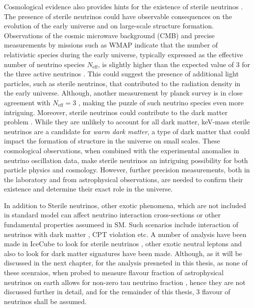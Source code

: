 Cosmological evidence also provides hints for the existence of sterile neutrinos . The presence of sterile neutrinos could have observable consequences on the evolution of the early universe and on large-scale structure formation. Observations of the cosmic microwave background (CMB) and precise measurements by missions such as WMAP indicate that the number of relativistic species during the early universe, typically expressed as the effective number of neutrino species  $N_{\text{eff}}$, is slightly higher than the expected value of 3 for the three active neutrinos .  This could suggest the presence of additional light particles, such as sterile neutrinos, that contributed to the radiation density in the early universe. Although, another measurement by planck survey is in close agreement with $N_{\text{eff}}=3$ , making the puzzle of such neutrino species even more intriguing.  Moreover, sterile neutrinos could contribute to the dark matter problem . While they are unlikely to account for all dark matter, keV-mass sterile neutrinos are a candidate for \emph{warm dark matter}, a type of dark matter that could impact the formation of structure in the universe on small scales. These cosmological observations, when combined with the experimental anomalies in neutrino oscillation data, make sterile neutrinos an intriguing possibility for both particle physics and cosmology. However, further precision measurements, both in the laboratory and from astrophysical observations, are needed to confirm their existence and determine their exact role in the universe.

In addition to Sterile neutrinos, other exotic phenomena, which are not included in standard model can affect neutrino interaction cross-sections or other fundamental properties assumeed in SM. Such scenarios include interaction of neutrinos with dark matter , CPT violation  etc. A number of analysis have been made in IceCube to look for sterile neutrinos , other exotic neutral leptons  and also to look for dark matter signatures  have been made. Although, as it will be discussed in the next chapter, for the analysis presneted in this thesis, as none of these scenraios, when probed to measure flavour fraction of astrophysical neutrinos on earth allows for non-zero tau neutrino fraction , hence they are not discussed further in detail, and for the remainder of this thesis, 3 flavour of neutrinos shall be assumed. 